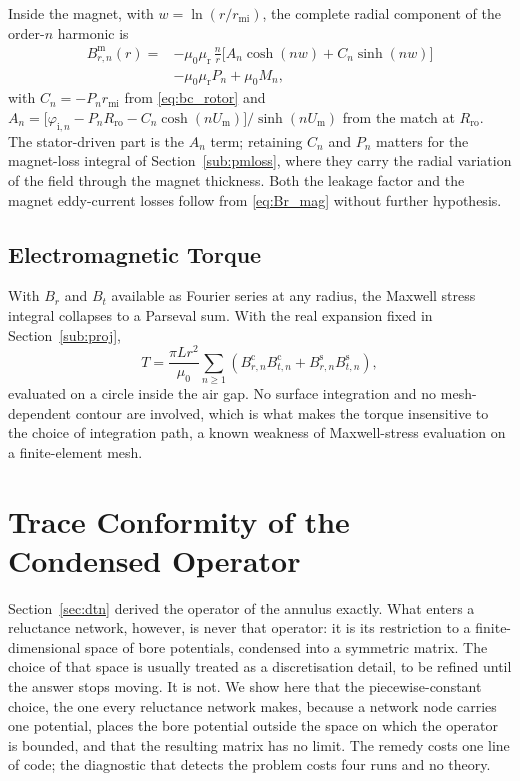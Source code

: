 \documentclass[10pt,a4paper,twocolumn]{article}
\newcommand{\Rro}{R_{\mathrm{ro}}}
\newcommand{\rmi}{r_{\mathrm{mi}}}
\newcommand{\murec}{\mu_{\mathrm{r}}}
\newcommand{\Um}{U_{\mathrm{m}}}
\theoremstyle{plain}
\theoremstyle{remark}
\begin{document}
Inside the magnet, with $w=\ln(r/\rmi)$, the complete radial component
of the order-$n$ harmonic is
\begin{equation}
\begin{aligned}
B_{r,n}^{\mathrm{m}}(r) = &-\mu_0\murec\,\frac{n}{r}
\Big[A_n\cosh(nw)+C_n\sinh(nw)\Big]\\ &- \mu_0\murec P_n + \mu_0 M_n ,
\end{aligned}
\label{eq:Br_mag}
\end{equation}
with $C_n=-P_n\rmi$ from \eqref{eq:bc_rotor} and
$A_n=\big[\varphi_{\mathrm{i},n}-P_n\Rro-C_n\cosh(n\Um)\big]/\sinh(n\Um)$
from the match at $\Rro$. The stator-driven part is the $A_n$ term;
retaining $C_n$ and $P_n$ matters for the magnet-loss integral of
Section~\ref{sub:pmloss}, where they carry the radial variation of the
field through the magnet thickness. Both the leakage factor and the
magnet eddy-current losses follow from \eqref{eq:Br_mag} without further
hypothesis.


\subsection{Electromagnetic Torque}

With $B_r$ and $B_t$ available as Fourier series at any radius, the
Maxwell stress integral collapses to a Parseval sum. With the real
expansion fixed in Section~\ref{sub:proj},
\begin{equation}
T = \frac{\pi L r^2}{\mu_0}
\sum_{n\ge1}\left(B_{r,n}^{\mathrm{c}}B_{t,n}^{\mathrm{c}}
+ B_{r,n}^{\mathrm{s}}B_{t,n}^{\mathrm{s}}\right),
\label{eq:torque}
\end{equation}
evaluated on a circle inside the air gap. No surface integration and no
mesh-dependent contour are involved, which is what makes the torque
insensitive to the choice of integration path, a known weakness of
Maxwell-stress evaluation on a finite-element mesh.



\section{Trace Conformity of the Condensed Operator}
\label{sec:trace}

Section~\ref{sec:dtn} derived the operator of the annulus exactly. What
enters a reluctance network, however, is never that operator: it is its
restriction to a finite-dimensional space of bore potentials, condensed
into a symmetric matrix. The choice of that space is usually treated as
a discretisation detail, to be refined until the answer stops moving.
It is not. We show here that the piecewise-constant choice, the one
every reluctance network makes, because a network node carries one
potential, places the bore potential outside the space on which the
operator is bounded, and that the resulting matrix has no limit. The
remedy costs one line of code; the diagnostic that detects the problem
costs four runs and no theory.
\end{document}
